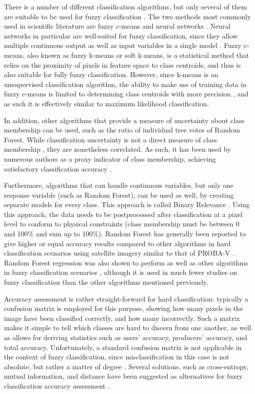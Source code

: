 \documentclass[a4paper,10pt]{article}
\begin{document}
There is a number of different classification algorithms, but only several of them are suitable to be used for fuzzy classification \cite{nath2014methods}. The two methods most commonly used in scientific literature are fuzzy c-means and neural networks \cite{zhang2001fullyfuzzy}. Neural networks in particular are well-suited for fuzzy classification, since they allow multiple continuous output as well as input variables in a single model \cite{foody1997fuzzynnet}. Fuzzy c-means, also known as fuzzy k-means or soft k-means, is a statistical method that relies on the proximity of pixels in feature space to class centroids, and thus is also suitable for fully fuzzy classification. However, since k-means is an unsupervised classification algorithm, the ability to make use of training data in fuzzy c-means is limited to determining class centroids with more precision \cite{hengl2004fuzzycmeans}, and as such it is effectively similar to maximum likelihood classification.

In addition, other algorithms that provide a measure of uncertainty about class membership can be used, such as the ratio of individual tree votes of Random Forest. While classification uncertainty is not a direct measure of class membership \cite{sytze2000fuzzyset}, they are nonetheless correlated. As such, it has been used by numerous authors as a proxy indicator of class membership, achieving satisfactory classification accuracy \cite{foody2002accuracy}.

Furthermore, algorithms that can handle continuous variables, but only one response variable (such as Random Forest), can be used as well, by creating separate models for every class. This approach is called Binary Relevance \cite{karalas2016br}. Using this approach, the data needs to be postprocessed after classification at a pixel level to conform to physical constraints (class membership must be between 0 and 100\% and sum up to 100\%). Random Forest has generally been reported to give higher or equal accuracy results compared to other algorithms in hard classification scenarios using satellite imagery similar to that of PROBA-V \cite{duro2012algorithmcomparison}. Random Forest regression was also shown to perform as well as other algorithms in fuzzy classification scenarios \cite{walton2008subpixelrf}, although it is used in much fewer studies on fuzzy classification than the other algorithms mentioned previously.

Accuracy assessment is rather straight-forward for hard classification: typically a confusion matrix is employed for this purpose, showing how many pixels in the image have been classified correctly, and how many incorrectly. Such a matrix makes it simple to tell which classes are hard to discern from one another, as well as allows for deriving statistics such as users' accuracy, producers' accuracy, and total accuracy. Unfortunately, a standard confusion matrix is not applicable in the context of fuzzy classification, since misclassification in this case is not absolute, but rather a matter of degree \cite{foody2002accuracy}. Several solutions, such as cross-entropy, mutual information, and distance have been suggested as alternatives for fuzzy classification accuracy assessment \cite{lu2007methods}.
\end{document}
